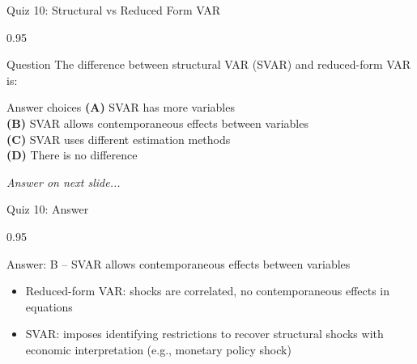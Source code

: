 \documentclass[9pt, aspectratio=169, t]{beamer}
\begin{document}
\begin{frame}{Quiz 10: Structural vs Reduced Form VAR}
    \begin{cminipage}{0.95\textwidth}
    \begin{alertblock}{Question}
        The difference between structural VAR (SVAR) and reduced-form VAR is:
    \end{alertblock}

    \vspace{0.4cm}

    \begin{block}{Answer choices}
        \textcolor{MainBlue}{\textbf{(A)}} SVAR has more variables\\[3pt]
        \textcolor{MainBlue}{\textbf{(B)}} SVAR allows contemporaneous effects between variables\\[3pt]
        \textcolor{MainBlue}{\textbf{(C)}} SVAR uses different estimation methods\\[3pt]
        \textcolor{MainBlue}{\textbf{(D)}} There is no difference
    \end{block}

    \vspace{0.5cm}

    \begin{center}
        \textit{Answer on next slide...}
    \end{center}
    \end{cminipage}
\end{frame}

\begin{frame}{Quiz 10: Answer}
    \begin{cminipage}{0.95\textwidth}
    \begin{exampleblock}{Answer: B -- SVAR allows contemporaneous effects between variables}
        \begin{itemize}
            \item Reduced-form VAR: shocks are correlated, no contemporaneous effects in equations
            \item SVAR: imposes identifying restrictions to recover structural shocks with economic interpretation (e.g., monetary policy shock)
        \end{itemize}
    \end{exampleblock}

    \end{cminipage}
\end{frame}
\end{document}
